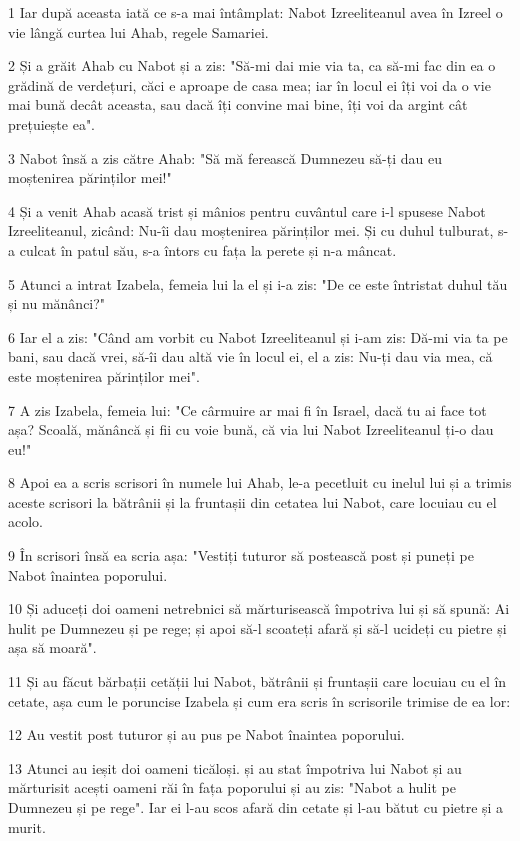 \par 1 Iar după aceasta iată ce s-a mai întâmplat: Nabot Izreeliteanul avea în Izreel o vie lângă curtea lui Ahab, regele Samariei.
\par 2 Și a grăit Ahab cu Nabot și a zis: "Să-mi dai mie via ta, ca să-mi fac din ea o grădină de verdețuri, căci e aproape de casa mea; iar în locul ei îți voi da o vie mai bună decât aceasta, sau dacă îți convine mai bine, îți voi da argint cât prețuiește ea".
\par 3 Nabot însă a zis către Ahab: "Să mă ferească Dumnezeu să-ți dau eu moștenirea părinților mei!"
\par 4 Și a venit Ahab acasă trist și mânios pentru cuvântul care i-l spusese Nabot Izreeliteanul, zicând: Nu-îi dau moștenirea părinților mei. Și cu duhul tulburat, s-a culcat în patul său, s-a întors cu fața la perete și n-a mâncat.
\par 5 Atunci a intrat Izabela, femeia lui la el și i-a zis: "De ce este întristat duhul tău și nu mănânci?"
\par 6 Iar el a zis: "Când am vorbit cu Nabot Izreeliteanul și i-am zis: Dă-mi via ta pe bani, sau dacă vrei, să-îi dau altă vie în locul ei, el a zis: Nu-ți dau via mea, că este moștenirea părinților mei".
\par 7 A zis Izabela, femeia lui: "Ce cârmuire ar mai fi în Israel, dacă tu ai face tot așa? Scoală, mănâncă și fii cu voie bună, că via lui Nabot Izreeliteanul ți-o dau eu!"
\par 8 Apoi ea a scris scrisori în numele lui Ahab, le-a pecetluit cu inelul lui și a trimis aceste scrisori la bătrânii și la fruntașii din cetatea lui Nabot, care locuiau cu el acolo.
\par 9 În scrisori însă ea scria așa: "Vestiți tuturor să postească post și puneți pe Nabot înaintea poporului.
\par 10 Și aduceți doi oameni netrebnici să mărturisească împotriva lui și să spună: Ai hulit pe Dumnezeu și pe rege; și apoi să-l scoateți afară și să-l ucideți cu pietre și așa să moară".
\par 11 Și au făcut bărbații cetății lui Nabot, bătrânii și fruntașii care locuiau cu el în cetate, așa cum le poruncise Izabela și cum era scris în scrisorile trimise de ea lor:
\par 12 Au vestit post tuturor și au pus pe Nabot înaintea poporului.
\par 13 Atunci au ieșit doi oameni ticăloși. și au stat împotriva lui Nabot și au mărturisit acești oameni răi în fața poporului și au zis: "Nabot a hulit pe Dumnezeu și pe rege". Iar ei l-au scos afară din cetate și l-au bătut cu pietre și a murit.
